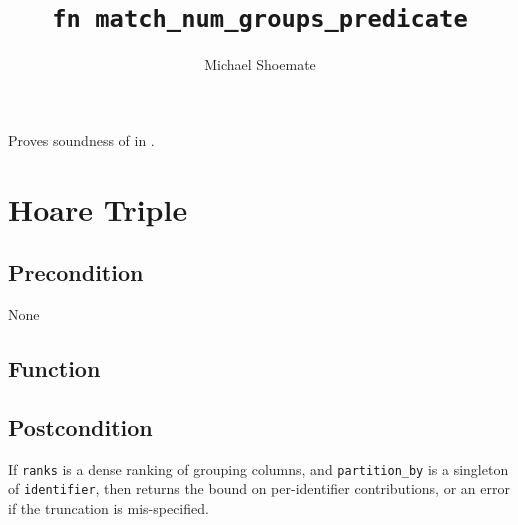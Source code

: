 \documentclass{article}
\title{\texttt{fn match\_num\_groups\_predicate}}
\author{Michael Shoemate}
\begin{document}
\maketitle  


\contrib

Proves soundness of  
in .

\section{Hoare Triple}
\subsection*{Precondition}
None 

\subsection*{Function}
\label{sec:python-pseudocode}


\subsection*{Postcondition}
\begin{theorem}[Postcondition]
    If \texttt{ranks} is a dense ranking of grouping columns,
    and \texttt{partition\_by} is a singleton of \texttt{identifier},
    then returns the bound on per-identifier contributions, 
    or an error if the truncation is mis-specified.
\end{theorem}
\end{document}
